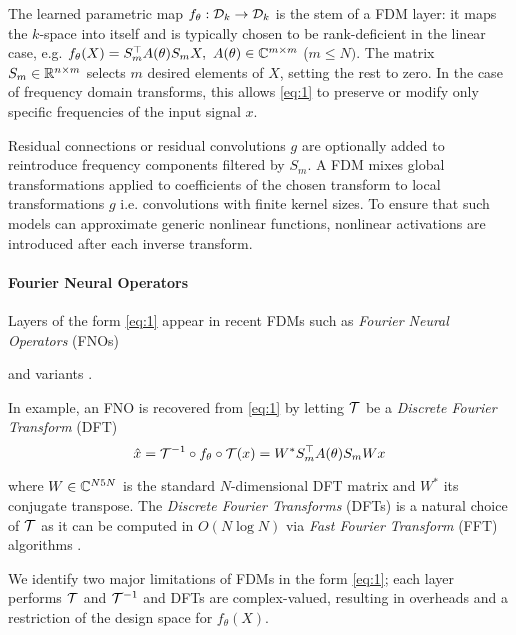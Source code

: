 The learned parametric map $f_\theta:\mathcal{D}_k\rightarrow\mathcal{D}_k$ is the stem of a FDM layer: it maps the $k$-space into itself and is typically chosen to be rank-deficient in the linear case, e.g. $f_\theta(X) = S_m^\top A(\theta) S_m X, ~A(\theta) \in \mathbb{C}^{m \times m}$ ($m \leq N)$. The matrix $S_m\in\mathbb{R}^{n\times m}$ selects $m$ desired elements of $X$, setting the rest to zero. In the case of frequency domain transforms, this allows \eqref{eq:1} to preserve or modify only specific frequencies of the input signal $x$. 

Residual connections or residual convolutions $g$ \citep{li2020fourier,wen2022u} are optionally added to reintroduce frequency components filtered by $S_m$. A FDM mixes global transformations applied to coefficients of the chosen transform to local transformations $g$ i.e. convolutions with finite kernel sizes. To ensure that such models can approximate generic nonlinear functions, nonlinear activations are introduced after each inverse transform.

\paragraph{Fourier Neural Operators}
%
Layers of the form \eqref{eq:1} appear in recent FDMs such as \textit{Fourier Neural Operators} (FNOs) \citep{li2020fourier} 
%

%
and variants \citep{tran2021factorized, guibas2021adaptive, wen2022u}.
%

In example, an FNO is recovered from \eqref{eq:1} by letting $\mathcal{T}$ be a \textit{Discrete Fourier Transform} (DFT)
\begin{equation*}
    \hat x = \mathcal{T}^{-1}\circ f_\theta\circ \mathcal{T} (x) = W^* S^\top_m A(\theta) S_m W x
\end{equation*}
%

%
where $W\in\mathbb{C}^{N5 N}$ is the standard $N$-dimensional DFT matrix and $W^*$ its conjugate transpose. The \textit{Discrete Fourier Transforms} (DFTs) is a natural choice of $\mathcal{T}$ as it can be computed in $O(N\log N)$ via \textit{Fast Fourier Transform} (FFT) algorithms \citep[Chapter 9.2]{oppenheim1999discrete}.
%

We identify two major limitations of FDMs in the form \eqref{eq:1}; each layer performs $\mathcal{T}$ and $\mathcal{T}^{-1}$ and DFTs are complex-valued, resulting in overheads and a restriction of the design space for $f_\theta(X)$.   



